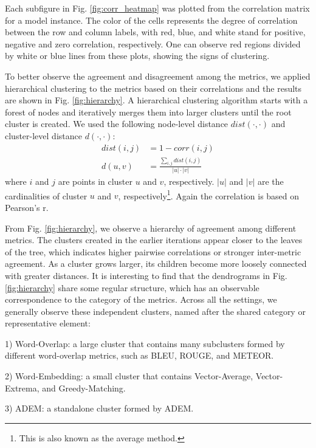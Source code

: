\documentclass[conference]{IEEEtran}
\begin{document}


Each subfigure in Fig. \ref{fig:corr_heatmap} was plotted from the correlation matrix for a model instance.
The color of the cells represents the degree of correlation between the row and column labels, with red, blue, and white stand for positive, negative and zero correlation, respectively.
One can observe red regions divided by white or blue lines from these plots, showing the signs of clustering.

To better observe the agreement and disagreement among the metrics, we applied hierarchical clustering to the metrics based on their correlations and the results are shown in Fig. \ref{fig:hierarchy}.
A hierarchical clustering algorithm starts with a forest of nodes and iteratively merges them into larger clusters until the root cluster is created.
We used the following node-level distance $\textit{dist}(\cdot, \cdot)$ and cluster-level distance $d(\cdot, \cdot)$:
\begin{align}
    \textit{dist}(i, j) &= 1 - \textit{corr}(i, j) \\
    d(u, v) &= \frac{\sum_{i,j}\textit{dist}(i, j)}{|u| \cdot |v|}
\end{align}
where $i$ and $j$ are points in cluster $u$ and $v$, respectively. $|u|$ and $|v|$ are the cardinalities of cluster $u$ and $v$, respectively\footnote{This is also known as the average method.}. Again the correlation is based on Pearson's r.


From Fig. \ref{fig:hierarchy}, we observe a hierarchy of agreement among different metrics.
The clusters created in the earlier iterations appear closer to the leaves of the tree, which indicates higher pairwise correlations or stronger inter-metric agreement.
As a cluster grows larger, its children become more loosely connected with greater distances.
It is interesting to find that the dendrograms in Fig. \ref{fig:hierarchy} share some regular structure, which has an observable correspondence to the category of the metrics. Across all the settings, we generally observe these independent clusters, named after the shared category or representative element:

1) Word-Overlap: a large cluster that contains many subclusters formed by different word-overlap metrics, such as BLEU, ROUGE, and METEOR.

2) Word-Embedding: a small cluster that contains Vector-Average, Vector-Extrema, and Greedy-Matching.

3) ADEM: a standalone cluster formed by ADEM.
\end{document}
